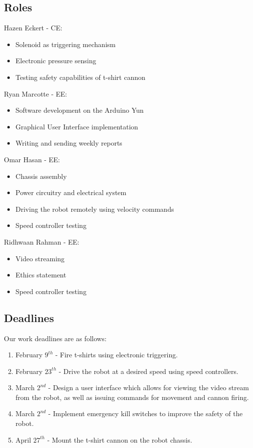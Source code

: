 \documentclass[letterpaper,12pt]{article}
\begin{document}
\subsection{Roles}
Hazen Eckert - CE:
\begin{itemize}
\item Solenoid as triggering  mechanism
\item Electronic pressure sensing 
\item Testing safety capabilities of t-shirt cannon
\end{itemize}
Ryan Marcotte - EE:
\begin{itemize}
\item Software development on the Arduino Yun
\item Graphical User Interface implementation
\item Writing and sending weekly reports
\end{itemize}


Omar Hasan - EE:
\begin{itemize}
\item Chassis assembly
\item Power circuitry and electrical system
\item Driving the robot remotely using velocity commands
\item Speed controller testing
\end{itemize}
Ridhwaan Rahman - EE:
\begin{itemize}
\item Video streaming
\item Ethics statement
\item Speed controller testing
\end{itemize}
\subsection{Deadlines}
Our work deadlines are as follows:
\begin{enumerate}
\item February $9^{th}$ - Fire t-shirts using electronic triggering.
\item February $23^{th}$ - Drive the robot at a desired speed using speed controllers.
\item March $2^{nd}$ - Design a user interface which allows for viewing the video stream from the robot, as well as issuing commands for movement and cannon firing.
\item March $2^{nd}$ - Implement emergency kill switches to improve the safety of the robot.
\item April $27^{th}$ - Mount the t-shirt cannon on the robot chassis.
\end{enumerate}
\end{document}

